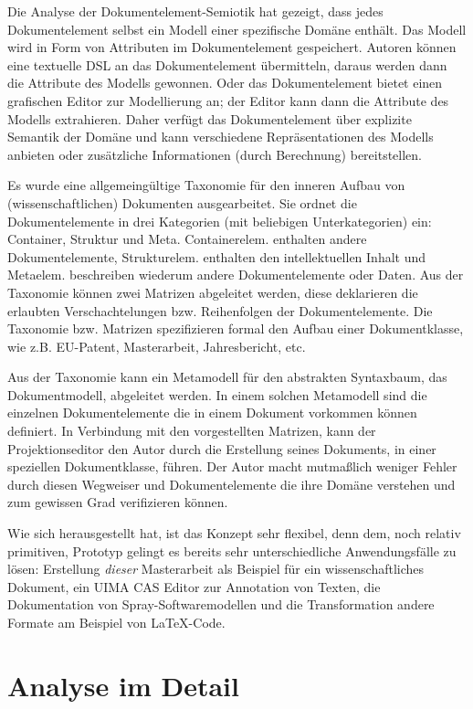  
Die Analyse der Dokumentelement-Semiotik hat gezeigt, dass jedes Dokumentelement selbst ein Modell einer spezifische Domäne enthält. Das Modell wird in Form von Attributen im Dokumentelement gespeichert. Autoren können eine textuelle DSL an das Dokumentelement übermitteln, daraus werden dann die Attribute des Modells gewonnen. Oder das Dokumentelement bietet einen grafischen Editor zur Modellierung an; der Editor kann dann die Attribute des Modells extrahieren. Daher verfügt das Dokumentelement über explizite Semantik der Domäne und kann verschiedene Repräsentationen des Modells anbieten oder zusätzliche Informationen (durch Berechnung) bereitstellen.

 
Es wurde eine allgemeingültige Taxonomie für den inneren Aufbau von (wissenschaftlichen) Dokumenten ausgearbeitet. Sie ordnet die Dokumentelemente in drei Kategorien (mit beliebigen Unterkategorien) ein: Container, Struktur und Meta. Containerelem. enthalten andere Dokumentelemente, Strukturelem. enthalten den intellektuellen Inhalt und Metaelem. beschreiben wiederum andere Dokumentelemente oder Daten. Aus der Taxonomie können zwei Matrizen abgeleitet werden, diese deklarieren die erlaubten Verschachtelungen bzw. Reihenfolgen der Dokumentelemente. Die Taxonomie bzw. Matrizen spezifizieren formal den Aufbau einer Dokumentklasse, wie z.B. EU-Patent, Masterarbeit, Jahresbericht, etc.

 
Aus der Taxonomie kann ein Metamodell für den abstrakten Syntaxbaum, das Dokumentmodell, abgeleitet werden. In einem solchen Metamodell sind die einzelnen Dokumentelemente die in einem Dokument vorkommen können definiert. In Verbindung mit den vorgestellten Matrizen, kann der Projektionseditor den Autor durch die Erstellung seines Dokuments, in einer speziellen Dokumentklasse, führen. Der Autor macht mutmaßlich weniger Fehler durch diesen Wegweiser und Dokumentelemente die ihre Domäne verstehen und zum gewissen Grad verifizieren können.

 
Wie sich herausgestellt hat, ist das Konzept sehr flexibel, denn dem, noch relativ primitiven, Prototyp gelingt es bereits sehr unterschiedliche Anwendungsfälle zu lösen: Erstellung \emph{dieser} Masterarbeit als Beispiel für ein wissenschaftliches Dokument, ein UIMA CAS Editor zur Annotation von Texten, die Dokumentation von Spray-Softwaremodellen und die Transformation andere Formate am Beispiel von LaTeX-Code.

 
\section{Analyse im Detail}\label{}
 
